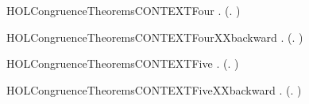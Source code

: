 \begin{SaveVerbatim}{HOLCongruenceTheoremsCONTEXTFour}
\HOLTokenTurnstile{} \HOLSymConst{\HOLTokenForall{}} .   \HOLSymConst{\HOLTokenConj{}}   \HOLSymConst{\HOLTokenImp{}}  (\HOLTokenLambda{}.   \HOLSymConst{\ensuremath{+}}  )
\end{SaveVerbatim}
\newcommand{\HOLCongruenceTheoremsCONTEXTFour}{\UseVerbatim{HOLCongruenceTheoremsCONTEXTFour}}
\begin{SaveVerbatim}{HOLCongruenceTheoremsCONTEXTFourXXbackward}
\HOLTokenTurnstile{} \HOLSymConst{\HOLTokenForall{}} .  (\HOLTokenLambda{}.   \HOLSymConst{\ensuremath{+}}  ) \HOLSymConst{\HOLTokenImp{}}   \HOLSymConst{\HOLTokenConj{}}  
\end{SaveVerbatim}
\newcommand{\HOLCongruenceTheoremsCONTEXTFourXXbackward}{\UseVerbatim{HOLCongruenceTheoremsCONTEXTFourXXbackward}}
\begin{SaveVerbatim}{HOLCongruenceTheoremsCONTEXTFive}
\HOLTokenTurnstile{} \HOLSymConst{\HOLTokenForall{}} .   \HOLSymConst{\HOLTokenConj{}}   \HOLSymConst{\HOLTokenImp{}}  (\HOLTokenLambda{}.   \HOLSymConst{\ensuremath{\parallel}}  )
\end{SaveVerbatim}
\newcommand{\HOLCongruenceTheoremsCONTEXTFive}{\UseVerbatim{HOLCongruenceTheoremsCONTEXTFive}}
\begin{SaveVerbatim}{HOLCongruenceTheoremsCONTEXTFiveXXbackward}
\HOLTokenTurnstile{} \HOLSymConst{\HOLTokenForall{}} .  (\HOLTokenLambda{}.   \HOLSymConst{\ensuremath{\parallel}}  ) \HOLSymConst{\HOLTokenImp{}}   \HOLSymConst{\HOLTokenConj{}}  
\end{SaveVerbatim}
